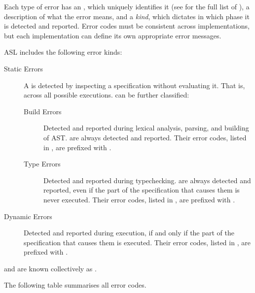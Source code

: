 \hypertarget{def-errorcodeterm}{}
Each type of error has an \emph{\errorcodeterm}, which uniquely identifies it
(see  for the full list of \errorcodesterm),
a description of what the error means,
and a \emph{kind}, which dictates in which phase it is detected and reported.
Error codes must be consistent across implementations, but each implementation
can define its own appropriate error messages.

ASL includes the following error kinds:
\begin{description}
  \item[Static Errors] \hypertarget{def-staticerrorterm}{}
  A \emph{\staticerrorterm} is detected by inspecting a specification without evaluating it.
  That is, across all possible executions. \staticerrorsterm{} can be further classified:
  \begin{description}
    \item[Build Errors] \hypertarget{def-builderrorterm}{}
      Detected and reported during lexical analysis, parsing, and building of AST.
      \Builderrorsterm{} are always detected and reported.
      Their error codes, listed in , are prefixed with \BuildErrorPrefix.

    \item[Type Errors] \hypertarget{def-typingerrorterm}{}
      Detected and reported during typechecking.
      \Typingerrorsterm{} are always detected and reported, even if the part of the specification that causes them is never executed.
      Their error codes, listed in , are prefixed with \TypeErrorPrefix.
  \end{description}

  \item[Dynamic Errors] \hypertarget{def-dynamicerrorterm}{}
    Detected and reported during execution, if and only if the part of the specification that causes them is executed.
    Their error codes, listed in , are prefixed with \DynamicErrorPrefix.
\end{description}

\Builderrorsterm{} and \typingerrorsterm{} are known collectively as \staticerrorsterm.

The following table summarises all error codes.

